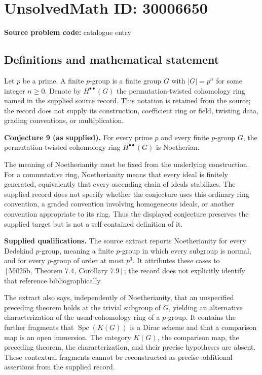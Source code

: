 \documentclass[11pt]{article}
\begin{document}
\section*{UnsolvedMath ID: 30006650}
\textbf{Source problem code:} catalogue entry
\subsection{Definitions and mathematical statement}
Let \(p\) be a prime. A finite \(p\)-group is a finite group \(G\) with \(|G|=p^n\) for some integer \(n\geq 0\). Denote by \(H^{\bullet\bullet}(G)\) the permutation-twisted cohomology ring named in the supplied source record. This notation is retained from the source; the record does not supply its construction, coefficient ring or field, twisting data, grading conventions, or multiplication.

\textbf{Conjecture 9 (as supplied).} For every prime \(p\) and every finite \(p\)-group \(G\), the permutation-twisted cohomology ring \(H^{\bullet\bullet}(G)\) is Noetherian.

The meaning of Noetherianity must be fixed from the underlying construction. For a commutative ring, Noetherianity means that every ideal is finitely generated, equivalently that every ascending chain of ideals stabilizes. The supplied record does not specify whether the conjecture uses this ordinary ring convention, a graded convention involving homogeneous ideals, or another convention appropriate to its ring. Thus the displayed conjecture preserves the supplied target but is not a self-contained definition of it.

\textbf{Supplied qualifications.} The source extract reports Noetherianity for every Dedekind \(p\)-group, meaning a finite \(p\)-group in which every subgroup is normal, and for every \(p\)-group of order at most \(p^3\). It attributes these cases to \([\mathrm{Mil25b},\ \text{Theorem }7.4,\ \text{Corollary }7.9]\); the record does not explicitly identify that reference bibliographically.

The extract also says, independently of Noetherianity, that an unspecified preceding theorem holds at the trivial subgroup of \(G\), yielding an alternative characterization of the usual cohomology ring of a \(p\)-group. It contains the further fragments that \(\operatorname{Spc}(K(G))\) is a Dirac scheme and that a comparison map is an open immersion. The category \(K(G)\), the comparison map, the preceding theorem, the characterization, and their precise hypotheses are absent. These contextual fragments cannot be reconstructed as precise additional assertions from the supplied record.
\end{document}
